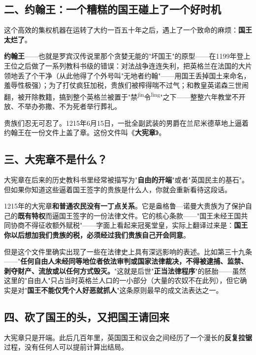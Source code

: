\documentclass[a4paper,12pt]{ctexart}
\newcommand{\ruby}[2]{#1\textsuperscript{#2}}
\begin{document}
\subsection*{二、约翰王：一个糟糕的国王碰上了一个好时机}

这个高效的集权机器在运转了大约一百五十年之后，遇上了一个致命的麻烦：\textbf{国王太烂了}。

\textbf{约翰王}——也就是罗宾汉传说里那个贪婪无能的"坏国王"的原型——在1199年登上王位之后做了一系列教科书级的错误：对法战争连连失利，把英格兰在法国的大片领地丢了个干净（从此他得了个外号叫"无地者约翰"——用国王丢掉国土来命名，羞辱性极强）；为了打仗疯狂加税，贵族们被榨得喘不过气；和教皇英诺森三世闹翻，被开除教籍，搞到整个英格兰被置于"\ruby{禁}{jìn}\ruby{令}{lìng}"之下——整整六年教堂不开放、不举办弥撒、不为死者举行葬礼。

贵族们忍无可忍了。1215年6月15日，一批全副武装的男爵在兰尼米德草地上逼着约翰王在一份文件上盖了章。这份文件叫《\textbf{大宪章}》。

\subsection*{三、大宪章不是什么？}

大宪章在后来的历史教科书里经常被描写为"\textbf{自由的开端}"或者"英国民主的基石"。但如果你知道这些逼着国王签字的贵族是什么人，你就会重新看待这段话。

1215年的大宪章\textbf{和普通农民没有一丁点关系}。它是盎格鲁—诺曼大贵族为了保护自己的\textbf{既有特权}而逼国王签字的一份法律文件。它的核心条款——"国王未经王国共同协商不得征收额外赋税"——字面上看起来冠冕堂皇，实际上翻译过来是：\textbf{国王你以后想加我们贵族的税，必须经过我们贵族自己开会同意}。

但是这个文件里确实出现了一些在法律史上具有深远影响的表述。比如第三十九条——"\textbf{任何自由人未经同等地位者依法审判或国家法律裁决，不得被逮捕、监禁、剥夺财产、流放或以任何方式毁灭。}"这就是后世"\textbf{正当法律程序}"的胚胎——虽然这里的"自由人"只占当时英格兰人口的一小部分（大量的农奴不在此列），但它确实是对"\textbf{国王不能仅凭个人好恶就抓人}"这条原则最早的成文法表达之一。

\subsection*{四、砍了国王的头，又把国王请回来}

大宪章只是开端。此后几百年里，英国国王和议会之间经历了一个漫长的\textbf{反复拉锯}过程，没有任何人可以提前计算出结局。
\end{document}
